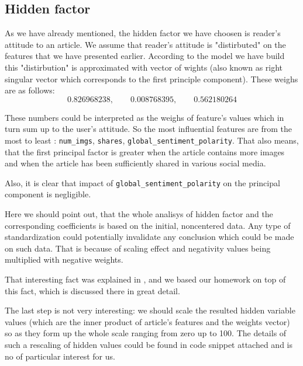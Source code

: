\subsection{Hidden factor}
As we have already mentioned, the hidden factor we have choosen is reader's attitude to an article. We assume that reader's attitude is "distirbuted" on the features that we have presented earlier. According to the model we have build this "distirbution" is approximated with vector of wights (also known as right singular vector which corresponds to the first principle component). These weighs are as follows: 
\begin{equation}
0.826968238, \qquad 0.008768395,\qquad 0.562180264
\end{equation}	

These numbers could be interpreted as the weighs of feature's values  which in turn sum up to the user's attitude. So the most influential features are from the most to least : \texttt{num\_imgs},  \texttt{shares}, \texttt{global\_sentiment\_polarity}. 
That also means, that the first principal factor is greater when the article contains more images and when the article has been sufficiently shared in various social media. 

Also, it is clear that impact of  \texttt{global\_sentiment\_polarity} on the principal component is negligible.  


Here we should point out, that the whole analisys of hidden factor and the corresponding coefficients is based on the initial, noncentered data. Any type of standardization could potentially invalidate any conclusion which could be made on such data. That is because of scaling effect and negativity values being multiplied with negative weights. 

That interesting fact was explained in \cite{CCODA_Mirkin}, and we based our homework on top of this fact,  which is discussed there in great detail.

The last step is not very interesting: we  should scale the resulted hidden variable values (which are the inner product of article's features and the weights vector) so as they form up the whole scale ranging from zero up to 100. 
The details of such a rescaling of hidden values  could be found in code snippet attached and is no of particular interest for us.






